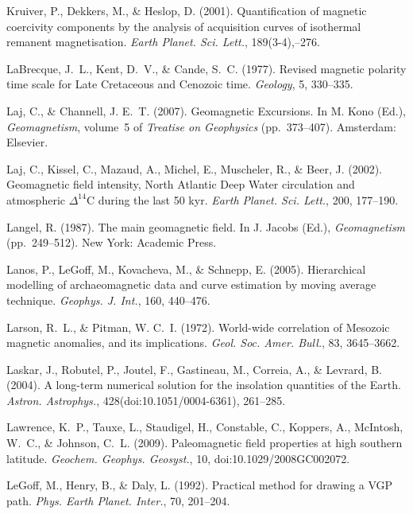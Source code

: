 \documentclass[,plain]{tauxe}
\begin{document}
\begin{thebibliography}{}
\bibitem{}%
Kruiver, P., Dekkers, M., \& Heslop, D. (2001).
Quantification of magnetic coercivity components by the analysis of acquisition curves of isothermal remanent magnetisation.
{\it Earth Planet. Sci. Lett.}, 189(3-4),--276.

\bibitem{}%
LaBrecque, J.~L., Kent, D.~V., \& Cande, S.~C. (1977).
Revised magnetic polarity time scale for Late Cretaceous and Cenozoic time.
{\it Geology}, 5, 330--335.

\bibitem{}%
Laj, C., \& Channell, J. E.~T. (2007).
Geomagnetic Excursions.
In M. Kono (Ed.), {\it Geomagnetism}, volume~5 of {\it Treatise on
Geophysics} (pp.\ 373--407). Amsterdam: Elsevier.

\bibitem{}%
Laj, C., Kissel, C., Mazaud, A., Michel, E., Muscheler, R., \& Beer, J. (2002).
Geomagnetic field intensity, North Atlantic Deep Water circulation and atmospheric $\Delta^{14}$C during the last 50 kyr.
{\it Earth Planet. Sci. Lett.}, 200, 177--190.

\bibitem{}%
Langel, R. (1987).
The main geomagnetic field.
In J. Jacobs (Ed.), {\it Geomagnetism} (pp.\ 249--512). New York: Academic Press.

\bibitem{}%
Lanos, P., LeGoff, M., Kovacheva, M., \& Schnepp, E. (2005).
Hierarchical modelling of archaeomagnetic data and curve estimation by moving average technique.
{\it Geophys. J. Int.}, 160, 440--476.

\bibitem{}%
Larson, R.~L., \& Pitman, W. C.~I. (1972).
World-wide correlation of Mesozoic magnetic anomalies, and its implications.
{\it Geol. Soc. Amer. Bull.}, 83, 3645--3662.

\bibitem{}%
Laskar, J., Robutel, P., Joutel, F., Gastineau, M., Correia, A., \& Levrard, B. (2004).
A long-term numerical solution for the insolation quantities of the Earth.
{\it Astron. Astrophys.}, 428(doi:10.1051/0004-6361), 261--285.

\bibitem{}%
Lawrence, K.~P., Tauxe, L., Staudigel, H., Constable, C., Koppers, A., McIntosh, W.~C., \& Johnson, C.~L. (2009).
Paleomagnetic field properties at high southern latitude.
{\it Geochem. Geophys. Geosyst.}, 10, doi:10.1029/2008GC002072.

\bibitem{}%
LeGoff, M., Henry, B., \& Daly, L. (1992).
Practical method for drawing a VGP path.
{\it Phys. Earth Planet. Inter.}, 70, 201--204.


\end{thebibliography}
\end{document}
